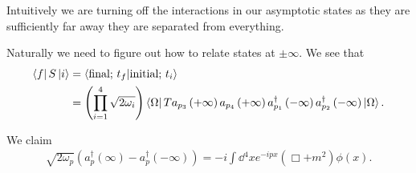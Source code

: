 Intuitively we are turning off the interactions in our asymptotic states as they are sufficiently far away they are separated from everything.

Naturally we need to figure out how to relate states at $\pm \infty$. We see that
\begin{align}
    \bra{f} S \ket{i} &= \bra{\text{final; }t_f} \ket{\text{initial; } t_i} \\
    &= \left( \prod_{i = 1}^{4} \sqrt{2 \omega_i}   \right) \bra{\Omega} T a_{p_3} \left( + \infty \right) a_{p_4} \left( + \infty \right) a_{p_1}^{\dag} \left( - \infty \right) a_{p_2}^{\dag} \left( - \infty \right) \ket{\Omega}
.\end{align}

\begin{claim}
    We claim
    \begin{align}
        \sqrt{2 \omega_p}  \left( a_p^{\dag} \left( \infty \right) - a^{\dag}_p \left( - \infty \right)  \right) = -i \int \dd{^{4}x} e^{-i p x} \left( \Box + m^2 \right) \phi \left( x \right) 
    .\end{align}
\end{claim}

